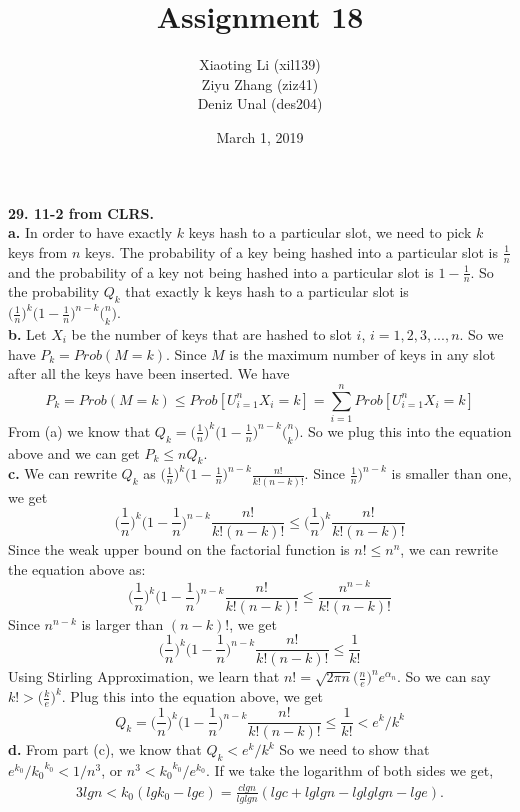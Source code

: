 \documentclass{article}
\title{Assignment 18}
\author{Xiaoting Li (xil139) \\
Ziyu Zhang (ziz41) \\
Deniz Unal (des204)}
\date{March 1, 2019}
\begin{document}
\maketitle

\noindent
\textbf{29. 11-2 from CLRS.}\\ \newline
\textbf{a.} In order to have exactly $k$ keys hash to a particular slot, we need to pick $k$ keys from $n$ keys. The probability of a key being hashed into a particular slot is $\frac{1}{n}$ and the probability of a key not being hashed into a particular slot is $1 - \frac{1}{n}$. So the probability $Q_k$ that exactly k keys hash to a particular slot is $\big(\frac{1}{n})^k\big(1 - \frac{1}{n})^{n-k}\big(_k^n)$. \\ \newline 
\textbf{b.} Let $X_i$ be the number of keys that are hashed to slot $i$, $i = 1, 2, 3, ..., n$. So we have $P_k = Prob(M = k)$. Since $M$ is the maximum number of keys in any slot after all the keys have been inserted. We have $$P_k = Prob(M = k) \leq Prob[U_{i=1}^{n}X_i = k] = \sum_{i=1}^{n}Prob[U_{i=1}^{n}X_i = k]$$
From (a) we know that $Q_k = \big(\frac{1}{n})^k\big(1 - \frac{1}{n})^{n-k}\big(_k^n)$. So we plug this into the equation above and we can get $P_k \leq nQ_k$. \\ \newline
\textbf{c.} We can rewrite $Q_k$ as $\big(\frac{1}{n})^k\big(1 - \frac{1}{n})^{n-k}\frac{n!}{k!(n-k)!}$. Since $\frac{1}{n})^{n-k}$ is smaller than one, we get $$\big(\frac{1}{n})^k\big(1 - \frac{1}{n})^{n-k}\frac{n!}{k!(n-k)!} \leq \big(\frac{1}{n})^k \frac{n!}{k!(n-k)!}$$
Since the weak upper bound on the factorial function is $n! \leq n^n$, we can rewrite the equation above as: $$\big(\frac{1}{n})^k\big(1 - \frac{1}{n})^{n-k}\frac{n!}{k!(n-k)!} \leq \frac{n^{n-k}}{k!(n - k)!}$$
Since $n^{n-k}$ is larger than $(n - k)!$, we get $$\big(\frac{1}{n})^k\big(1 - \frac{1}{n})^{n-k}\frac{n!}{k!(n-k)!} \leq \frac{1}{k!}$$
Using Stirling Approximation, we learn that $n! = \sqrt{2\pi n}\big(\frac{n}{e})^n e^{\alpha_n}$. So we can say $k! > \big(\frac{k}{e})^k$. Plug this into the equation above, we get 
$$Q_k = \big(\frac{1}{n})^k\big(1 - \frac{1}{n})^{n-k}\frac{n!}{k!(n-k)!} \leq \frac{1}{k!} < e^k/k^k$$
\textbf{d.} From part (c), we know that $Q_k < e^k/k^k$ So we need to show that $e^{k_0}/{k_0}^{k_0} < 1/n^3$, or $n^3 < {k_0}^{k_0}/e^{k_0}$. If we take the logarithm of both sides we get,
\begin{align*}
3lgn < k_0(lgk_0 - lge) = \frac {clgn}{lglgn}(lgc + lglgn - lglglgn - lge).
\end{align*}
\end{document}
